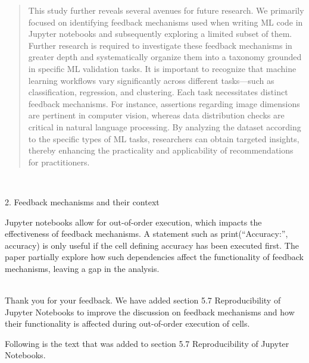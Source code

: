 \documentclass[11pt,fleqn]{article}
\newcommand{\eline}{\vspace*{.75\baselineskip}}
\newcommand{\Referee}[1]{\eline \noindent {\bf Reviewer comment #1:} \\}
\newcommand{\Us}{\eline \noindent {\bf Response:}\\}
\newenvironment{revcomment}[1][]
{\Referee{#1}\begin{rcomment}}
{\end{rcomment}}
\begin{document}
\begin{quote}
  This study further reveals several avenues for future research. We primarily focused on identifying feedback mechanisms used when writing ML code in Jupyter notebooks and subsequently exploring a limited subset of them. Further research is required to investigate these feedback mechanisms in greater depth and systematically organize them into a taxonomy grounded in specific ML validation tasks. It is important to recognize that machine learning workflows vary significantly across different tasks---such as classification, regression, and clustering. Each task necessitates distinct feedback mechanisms. For instance, assertions regarding image dimensions are pertinent in computer vision, whereas data distribution checks are critical in natural language processing. By analyzing the dataset according to the specific types of ML tasks, researchers can obtain targeted insights, thereby enhancing the practicality and applicability of recommendations for practitioners.
\end{quote}

\begin{revcomment}[2.7]
  2. Feedback mechanisms and their context

  Jupyter notebooks allow for out-of-order execution, which impacts the effectiveness of feedback mechanisms. A statement such as print(``Accuracy:'', accuracy) is only useful if the cell defining accuracy has been executed first. The paper partially explore how such dependencies affect the functionality of feedback mechanisms, leaving a gap in the analysis.

\end{revcomment}

\Us Thank you for your feedback. We have added section 5.7 Reproducibility of Jupyter Notebooks to improve the discussion on feedback mechanisms and how their functionality is affected during out-of-order execution of cells.

Following is the text that was added to section 5.7 Reproducibility of Jupyter Notebooks.
\end{document}
